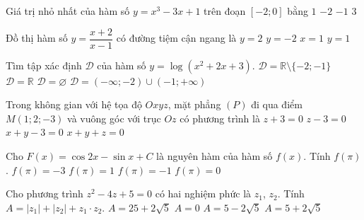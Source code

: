 \begin{ex}%
Giá trị nhỏ nhất của hàm số $y=x^3-3x+1$ trên đoạn $[-2;0]$ bằng
\choice
{$1$}
{$-2$}
{\True $-1$}
{ $3$}
\end{ex}
\begin{ex}%
Đồ thị hàm số $y=\dfrac{x+2}{x-1}$ có đường tiệm cận ngang là
\choice
{$y=2$}
{$y=-2$}
{$x=1$}
{\True $y=1$}
\end{ex}
\begin{ex}%
Tìm tập xác định $\mathscr{D}$ của hàm số $y=\log(x^2+2x+3)$.
\choice
{$\mathscr{D}=\mathbb{R}\setminus \{-2;-1\}$}
{\True $\mathscr{D}=\mathbb{R}$}
{$\mathscr{D}=\varnothing$}
{$ \mathscr{D}=(-\infty ;-2) \cup (-1;+\infty)$}
\end{ex}
\begin{ex}%
Trong không gian với hệ tọa độ $Oxyz$, mặt phẳng $(P)$ đi qua điểm $M(1;2;-3)$ và vuông góc với trục $Oz$ có phương trình là
\choice
{\True $z+3=0$}
{$z-3=0$}
{$x+y-3=0$}
{$x+y+z=0$}
\end{ex}
\begin{ex}%
Cho $F(x)=\cos 2x-\sin x+C$ là nguyên hàm của hàm số $f(x)$. Tính $f(\pi)$.
\choice
{$f(\pi)=-3$}
{\True $f(\pi)=1$}
{$f(\pi)=-1$}
{$f(\pi)=0$}
\end{ex}
\begin{ex}%
Cho phương trình $z^2-4z+5=0$ có hai nghiệm phức là $z_1$, $z_2$. Tính $A=|z_1|+|z_2|+z_1\cdot z_2$.
\choice
{$A=25+2\sqrt{5}$}
{$A=0$}
{$A=5-2\sqrt{5}$}
{\True $A=5+2\sqrt{5}$}
\end{ex}
